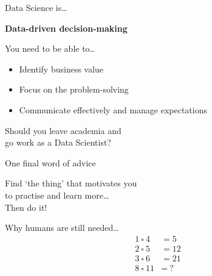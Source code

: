 \begin{frame}{Data Science is\ldots}
    \begin{center}
        \Large\bf%
        Data\hyp{}driven decision\hyp{}making
    \end{center}
    \vfill\pause
    You need to be able to\ldots
    \begin{itemize}
        \item Identify business value
        \item Focus on the problem\hyp{}solving
        \item Communicate effectively and manage expectations
    \end{itemize}
\end{frame}

\begin{frame}
    \begin{center}
        \LARGE%
        Should you leave academia and \\
        go work as a Data Scientist?
    \end{center}
\end{frame}

\begin{frame}{One final word of advice}
    \begin{center}
        {\large%
         Find `the thing' that motivates you \\
         to practise and learn more\ldots} \\[\bigskipamount]
        \pause
        {\Huge%
         Then do it!}
    \end{center}
\end{frame}

\begin{frame}{Why humans are still needed\ldots}
    \LARGE
    \begin{align*}
        1\ \square\ 4 &= 5 \\
        2\ \square\ 5 &= 12 \\
        3\ \square\ 6 &= 21 \\
        8\ \square\ 11 &=\ \text{?}
    \end{align*}
\end{frame}



